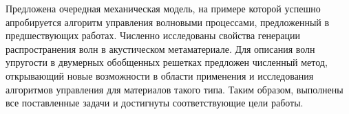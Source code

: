 Предложена очередная механическая модель, на примере которой успешно апробируется алгоритм управления волновыми процессами, предложенный в предшествующих работах. Численно исследованы свойства генерации распространения волн в акустическом метаматериале. Для описания волн упругости в двумерных обобщенных решетках предложен численный метод, открывающий новые возможности в области применения и исследования алгоритмов управления для материалов такого типа. Таким образом, выполнены все поставленные задачи и достигнуты соответствующие цели работы.
